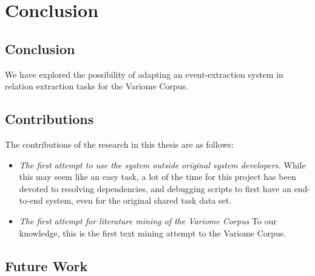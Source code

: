 \chapter{Conclusion}  %

\ifpdf
    \graphicspath{{Conclusion/Figs/Raster/}{Conclusion/Figs/PDF/}{Conclusion/Figs/}}
\else
    \graphicspath{{Conclusion/Figs/Vector/}{Conclusion/Figs/}}
\fi

\section{Conclusion} %
We have explored the possibility of adapting an event-extraction system in relation extraction tasks for the Variome Corpus. 

\section{Contributions}
The contributions of the research in this thesis are as follows:
\begin{itemize}
	\item \emph{The first attempt to use the system outside original system developers.} While this may seem like an easy task, a lot of the time for this project has been devoted to resolving dependencies, and debugging scripts to first have an end-to-end system, even for the original shared task data set.
	\item \emph{The first attempt for literature mining of the Variome Corpus} To our knowledge, this is the first text mining attempt to the Variome Corpus. 
\end{itemize}
\section{Future Work}
